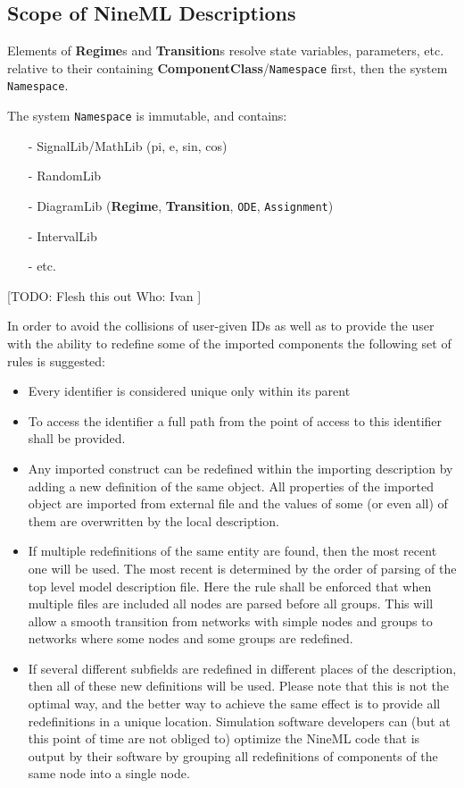 \documentclass{article}
\newcommand{\ComponentClass}{{\bf{ComponentClass}}\xspace}
\newcommand{\Regime}{{\bf{Regime}}\xspace}
\newcommand{\Regimes}{{\bf{Regime}}s\xspace}
\newcommand{\Transition}{{\bf{Transition}}\xspace}
\newcommand{\Transitions}{{\bf{Transition}}s\xspace}
\begin{document}
\subsection{Scope of NineML Descriptions}
\label{scope}

Elements of \Regimes and \Transitions resolve state
variables, parameters, etc. relative to their containing
\ComponentClass/{\tt Namespace} first, then the system {\tt Namespace}.

The system {\tt Namespace} is immutable, and contains:
\begin{itemize}
\item[-]{SignalLib/MathLib (pi, e, sin, cos)}
\item[-]{RandomLib}
\item[-]{DiagramLib (\Regime, \Transition, {\tt ODE},
{\tt Assignment})}
\item[-]{IntervalLib}
\item[-]{etc.}
\end{itemize}

[TODO:
Flesh this out
Who: Ivan
]

In order to avoid the collisions of user-given IDs as well as to
provide the user with the ability to redefine some of the imported
components the following set of rules is suggested:
\begin{itemize}
\item{Every identifier is considered unique only within its parent}
\item{To access the identifier a full path from the point of access
to this identifier shall be provided.}
\item{Any imported construct can be redefined within the importing
description by adding a new definition of the same object. All properties
of the imported object are imported from external file and the values of
some (or even all) of them are overwritten by the local description.}
\item{If multiple redefinitions of the same entity are found, then the most
recent one will be used. The most recent is determined by the order of
parsing of the top level model description file. Here the rule shall be
enforced that when multiple files are included all nodes are parsed before
all groups. This will allow a smooth transition from networks with simple
nodes and groups to networks where some nodes and some groups are redefined.}
\item{If several different subfields are redefined in different places of the
description, then all of these new definitions will be used. Please note that
this is not the optimal way, and the better way to achieve the same effect is
to provide all redefinitions in a unique location. Simulation software
developers can (but at this point of time are not obliged to) optimize the
NineML code that is output by their software by grouping all redefinitions
of components of the same node into a single node.}
\end{itemize}
\end{document}
